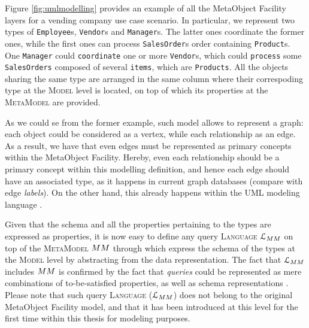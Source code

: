 \begin{example}
	Figure \ref{fig:umlmodelling} provides an example of all the MetaObject Facility layers for a vending company use case scenario. In particular, we represent two types of \texttt{Employee}s, \texttt{Vendor}s and \texttt{Manager}s. The latter ones coordinate the former ones, while the first ones can process \texttt{SalesOrder}s order containing \texttt{Product}s. One \texttt{Manager} could \texttt{coordinate} one or more \texttt{Vendor}s, which could \texttt{process} some \texttt{SalesOrders} composed of several \texttt{items}, which are \texttt{Products}. All the objects sharing the same type are arranged in the same column where their correspoding type at the \textsc{Model} level is located, on top of which its properties at the \textsc{MetaModel} are provided.
\end{example}

As we could se from the former example, such model allows to represent a graph: each object could be considered as a vertex, while each relationship as an edge. As a result, we have that even edges must be represented as primary concepts within the  MetaObject Facility. Hereby, even each relationship should be a primary concept within this modelling definition, and hence each edge should have an associated type, as it happens in current graph databases (compare with edge \textit{labels}). On the other hand, this already happens within the UML modeling language \cite{OMG2011a, OMG2011}.

Given that the schema and all the properties pertaining to the types are expressed as properties, it is now easy to define any query \textsc{Language} $\langg_\metamodel$ on top of the \textsc{MetaModel} $\metamodel$ through which express the schema of the types at the \textsc{Model} level by abstracting from the data representation. The fact that $\langg_\metamodel$ includes $\metamodel$ is confirmed by the fact that \textit{queries} could be represented as mere combinations of to-be-satisfied properties, as well as schema representations \cite{Lenzerini02}. Please note that such query  \textsc{Language} ($\langg_\metamodel$) does not belong to the original MetaObject Facility model, and that it has been introduced at this level for the first time within this thesis for modeling purposes.

